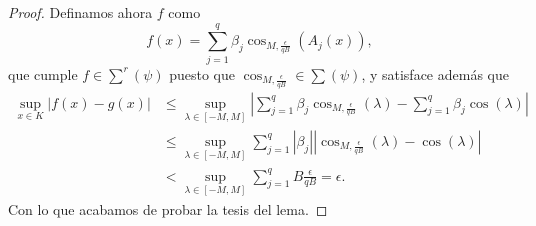\begin{proof}
    Definamos ahora $f$ como 
    \begin{equation}
        f(x) = \sum_{j=1}^q \beta_j 
        \cos_{M, \frac{\epsilon}{q B}}(A_j(x)),
    \end{equation}
    que cumple $f \in \sum^r(\psi)$  puesto que 
    $\cos_{M, \frac{\epsilon}{q B}} \in \sum(\psi)$, 
    y satisface además que
    \begin{equation}
        \begin{split}
        \sup_{x \in K} | f(x) - g(x)| 
        &\leq
        \sup_{\lambda \in [-M, M]} 
        | \sum_{j=1}^q \beta_j \cos_{M, \frac{\epsilon}{q B}}(\lambda )
         - 
         \sum_{j=1}^q \beta_j \cos(\lambda )|  \\
        &\leq
        \sup_{\lambda \in [-M, M]} 
        \sum_{j=1}^q 
            |\beta_j|
            |
                \cos_{M, \frac{\epsilon}{q B}}(\lambda)
                -
                \cos(\lambda)
            |
            \\   
            &<
            \sup_{\lambda \in [-M, M]} 
            \sum_{j=1}^q   
                B
                \frac{\epsilon}{q B}
            = \epsilon.
        \end{split}
    \end{equation}
     Con lo que acabamos de probar la tesis del lema. 
\end{proof}


